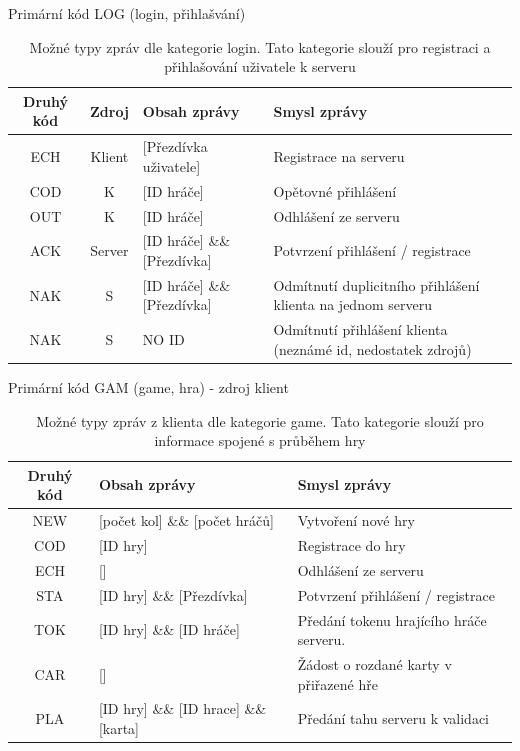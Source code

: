 \documentclass[12pt, a4paper]{article}
\begin{document}
\begin{table}[H]%
\centering
Primární kód LOG (login, přihlašvání)
\begin{tabular}{|c | c | p{4cm} | p{5cm} |}
\hline
Druhý kód &  Zdroj & Obsah zprávy & Smysl zprávy\\
\hline
ECH & Klient & [Přezdívka uživatele] & Registrace na serveru \\
\hline
COD & K &[ID hráče] & Opětovné přihlášení\\
\hline
OUT & K &[ID hráče] & Odhlášení ze serveru \\
\hline
ACK & Server &[ID hráče]    \&\&    [Přezdívka] & Potvrzení přihlášení / registrace \\
\hline
NAK & S &[ID hráče]    \&\&    [Přezdívka] & Odmítnutí duplicitního přihlášení klienta na jednom serveru \\
\hline
NAK & S &NO ID & Odmítnutí přihlášení klienta (neznámé id, nedostatek zdrojů) \\
\hline
\end{tabular}
\label{tab:zpravyLOGServer}
\caption{Možné typy zpráv dle kategorie login. Tato kategorie slouží pro registraci a přihlašování uživatele k serveru}
\end{table}

\begin{table}[H]%
\centering
Primární kód GAM (game, hra) - zdroj klient
\begin{tabular}{|c | p{4cm} | p{5cm} |}
\hline
Druhý kód & Obsah zprávy & Smysl zprávy\\
\hline
NEW  & [počet kol]    \&\&    [počet hráčů] & Vytvoření nové hry \\
\hline
COD  &[ID hry] & Registrace do hry\\
\hline
ECH &[] & Odhlášení ze serveru \\
\hline
STA &[ID hry]    \&\&    [Přezdívka] & Potvrzení přihlášení / registrace \\
\hline
TOK &[ID hry]    \&\&    [ID hráče] & Předání tokenu hrajícího hráče serveru. \\
\hline
CAR & [] & Žádost o rozdané karty v přiřazené hře \\
\hline
PLA &[ID hry]    \&\&    [ID hrace]    \&\&    [karta] & Předání tahu serveru k validaci \\

\hline
\end{tabular}
\label{tab:zpravyGAMSKlient}
\caption{Možné typy zpráv z klienta dle kategorie game. Tato kategorie slouží pro informace spojené s průběhem hry}
\end{table}
\end{document}
